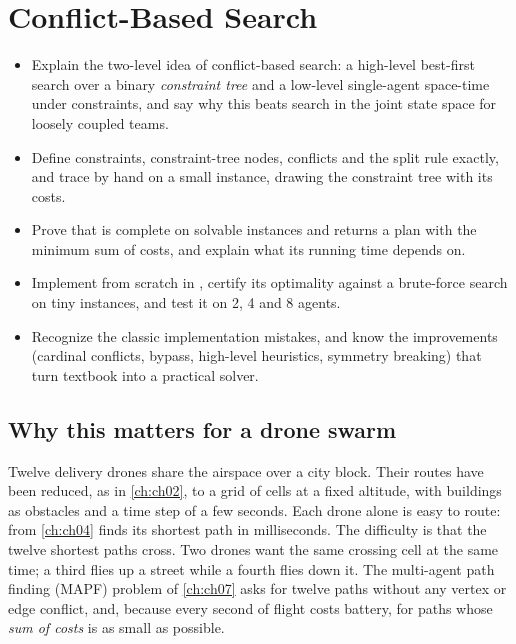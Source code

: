 \chapter{Conflict-Based Search}
\label{ch:ch09}

\begin{objectives}
\begin{itemize}
  \item Explain the two-level idea of conflict-based search: a high-level best-first search over a binary \emph{constraint tree} and a low-level single-agent space-time \astar under constraints, and say why this beats search in the joint state space for loosely coupled teams.
  \item Define constraints, constraint-tree nodes, conflicts and the split rule exactly, and trace \cbs by hand on a small instance, drawing the constraint tree with its costs.
  \item Prove that \cbs is complete on solvable instances and returns a plan with the minimum sum of costs, and explain what its running time depends on.
  \item Implement \cbs from scratch in \python, certify its optimality against a brute-force search on tiny instances, and test it on 2, 4 and 8 agents.
  \item Recognize the classic implementation mistakes, and know the improvements (cardinal conflicts, bypass, high-level heuristics, symmetry breaking) that turn textbook \cbs into a practical solver.
\end{itemize}
\end{objectives}

\section{Why this matters for a drone swarm}
\label{sec:ch09-motivation}

Twelve delivery drones share the airspace over a city block. Their routes
have been reduced, as in \cref{ch:ch02}, to a grid of cells at a fixed
altitude, with buildings as obstacles and a time step of a few seconds.
Each drone alone is easy to route: \astar from \cref{ch:ch04} finds its
shortest path in milliseconds. The difficulty is that the twelve shortest
paths cross. Two drones want the same crossing cell at the same time; a
third flies up a street while a fourth flies down it. The multi-agent path
finding (MAPF) problem of \cref{ch:ch07} asks for twelve paths without any
vertex or edge conflict, and, because every second of flight costs battery,
for paths whose \emph{sum of costs} is as small as possible.

